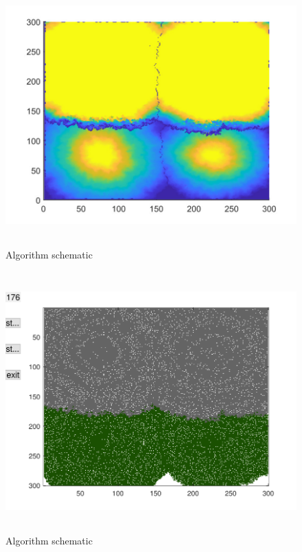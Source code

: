 \documentclass{mcmthesis}
\begin{document}
\begin{figure}[H] 
	\centering 
	\includegraphics[height=10cm]{./T5Figure/K2N2/K2N2A.pdf}
	\caption{Algorithm schematic}
\end{figure}
\begin{figure}[H] 
	\centering 
	\includegraphics[height=10cm]{./T5Figure/K2N2/K2N2F.pdf}
	\caption{Algorithm schematic}
\end{figure}
\end{document}

